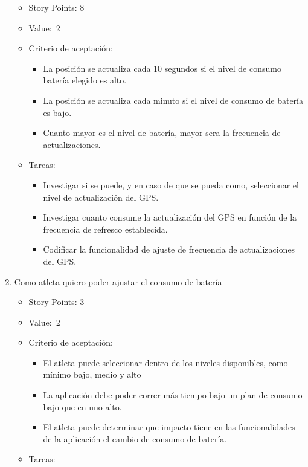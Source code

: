 \begin{enumerate}
  \begin{itemize}
  \item
    Story Points: 8
  \item
    Value:~2
  \item
    Criterio de aceptación:

    \begin{itemize}
    \itemsep1pt\parskip0pt
    \item
      La posición se actualiza cada 10 segundos si el nivel de consumo
      batería elegido es alto.
    \item
      La posición se actualiza cada minuto si el nivel de consumo de
      batería es bajo.
    \item
      Cuanto mayor es el nivel de batería, mayor sera la frecuencia de
      actualizaciones.
    \end{itemize}
  \item
    Tareas:

    \begin{itemize}
    \itemsep1pt\parskip0pt
    \item
      Investigar si se puede, y en caso de que se pueda como,
      seleccionar el nivel de actualización del GPS.
    \item
      Investigar cuanto consume la actualización del GPS en función de
      la frecuencia de refresco establecida.
    \item
      Codificar la funcionalidad de ajuste de frecuencia de
      actualizaciones del GPS.
    \end{itemize}
  \end{itemize}
\item
  Como atleta quiero poder ajustar el consumo de batería

  \begin{itemize}
  \item
    Story Points: 3
  \item
    Value:~2
  \item
    Criterio de aceptación:

    \begin{itemize}
    \itemsep1pt\parskip0pt
    \item
      El atleta puede seleccionar dentro de los niveles disponibles,
      como mínimo bajo, medio y alto
    \item
      La aplicación debe poder correr más tiempo bajo un plan de consumo
      bajo que en uno alto.
    \item
      El atleta puede determinar que impacto tiene en las
      funcionalidades de la aplicación el cambio de consumo de batería.
    \end{itemize}
  \item
    Tareas:


\end{itemize}
\end{enumerate}
